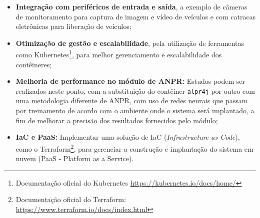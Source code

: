 \documentclass[12pt]{article}
\begin{document}
\begin{itemize}
	\item \textbf{Integração com periféricos de entrada e saída}, a exemplo de câmeras de monitoramento para captura de imagem e vídeo de veículos e com catracas eletrônicas para liberação de veículos;
	\item \textbf{Otimização de gestão e escalabilidade}, pela utilização de ferramentas como Kubernetes\footnote{Documentação oficial do Kubernetes \url{https://kubernetes.io/docs/home/}}, para melhor gerenciamento e escalabilidade dos contêineres;
	 \item \textbf{Melhoria de performance no módulo de ANPR:} Estudos podem ser realizados neste ponto, com a substituição do contêiner \texttt{alpr4j} por outro com uma metodologia diferente de ANPR, com uso de redes neurais que passam por treinamento de acordo com o ambiente onde o sistema será implantado, a fim de melhorar a precisão dos resultados fornecidos pelo módulo;
	 \item \textbf{IaC e PaaS:} Implementar uma solução de IaC (\textit{Infrastructure as Code}), como o Terraform\footnote{Documentação oficial do Terraform: \url{https://www.terraform.io/docs/index.html}}, para gerenciar a construção e implantação do sistema em nuvem (PaaS - Platform as a Service).
\end{itemize}



\end{document}

